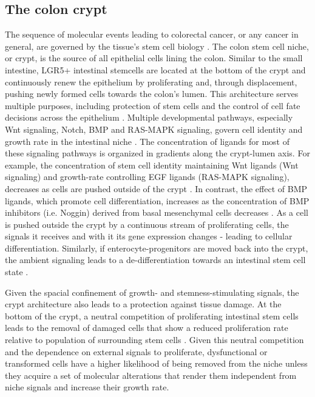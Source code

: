 \begin{flushleft}
\subsection{The colon crypt}
The sequence of molecular events leading to colorectal cancer, or any cancer in general, are governed by the tissue's stem cell biology \cite{CleversCancerStemCell}. The colon stem cell niche, or crypt, is the source of all epithelial cells lining the colon. Similar to the small intestine, LGR5+ intestinal stemcells are located at the bottom of the crypt and continuously renew the epithelium by proliferating and, through displacement, pushing newly formed cells towards the colon's lumen. This architecture serves multiple purposes, including protection of stem cells and the control of cell fate decisions across the epithelium \cite{cleversIntestinalCryptPrototype2013a}. Multiple developmental pathways, especially Wnt signaling, Notch, BMP and RAS-MAPK signaling, govern cell identity and growth rate in the intestinal niche \cite{Gehart2019}. The concentration of ligands for most of these signaling pathways is organized in gradients along the crypt-lumen axis. For example, the concentration of stem cell identity maintaining Wnt ligands (Wnt signaling) and growth-rate controlling EGF ligands (RAS-MAPK signaling), decreases as cells are pushed outside of the crypt \cite{Sasaki2016}. In contrast, the effect of BMP ligands, which promote cell differentiation, increases as the concentration of BMP inhibitors (i.e. Noggin) derived from basal mesenchymal cells decreases \cite{heBMPSignalingInhibits2004}. As a cell is pushed outside the crypt by a continuous stream of proliferating cells, the signals it receives and with it its gene expression changes - leading to cellular differentiation. Similarly, if enterocyte-progenitors are moved back into the crypt, the ambient signaling leads to a de-differentiation towards an intestinal stem cell state \cite{tettehReplacementLostLgr5Positive2016a}. \par

Given the spacial confinement of growth- and stemness-stimulating signals, the crypt architecture also leads to a protection against tissue damage. At the bottom of the crypt, a neutral competition of proliferating intestinal stem cells leads to the removal of damaged cells that show a reduced proliferation rate relative to population of surrounding stem cells \cite{snippertIntestinalCryptHomeostasis2010a}. Given this neutral competition and the dependence on external signals to proliferate, dysfunctional or transformed cells have a higher likelihood of being removed from the niche unless they acquire a set of molecular alterations that render them independent from niche signals and increase their growth rate. \par


\end{flushleft}
